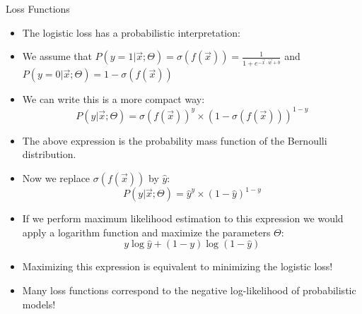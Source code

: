 \documentclass[handout]{beamer}
\begin{document}
\begin{frame}{Loss Functions}
\begin{scriptsize}
\begin{itemize}


 \item The logistic loss has a probabilistic interpretation:
 \item We assume that $P(y =1 | \vec{x} ; \Theta) = \sigma(f(\vec{x})) = \frac{1}{1+e^{-\vec{x}\cdot \vec{w}+b}}$  and $P(y = 0 | \vec{x} ; \Theta) = 1 - \sigma(f(\vec{x}))$
 \item We can write this is a more compact way: 
 \begin{displaymath}
  P(y | \vec{x} ; \Theta) = \sigma(f(\vec{x}))^y\times(1-\sigma(f(\vec{x})))^{1-y}
 \end{displaymath}

 \item The above expression is the probability mass function of the Bernoulli distribution.
 
\item Now we replace $\sigma(f(\vec{x}))$ by $\hat{y}$:
 \begin{displaymath}
  P(y | \vec{x} ; \Theta) = \hat{y}^y\times(1-\hat{y})^{1-y}
 \end{displaymath} 
\item If we perform maximum likelihood estimation to this expression we would apply a logarithm function and maximize the parameters $\Theta$:
 \begin{displaymath}
  y \log \hat{y} + (1-y) \log(1-\hat{y}) 
 \end{displaymath} 
 
\item Maximizing this expression is equivalent to minimizing the logistic loss!
 
\item Many loss functions correspond to the negative log-likelihood of probabilistic models!
 
\end{itemize}
\end{scriptsize}

\end{frame}
\end{document}

